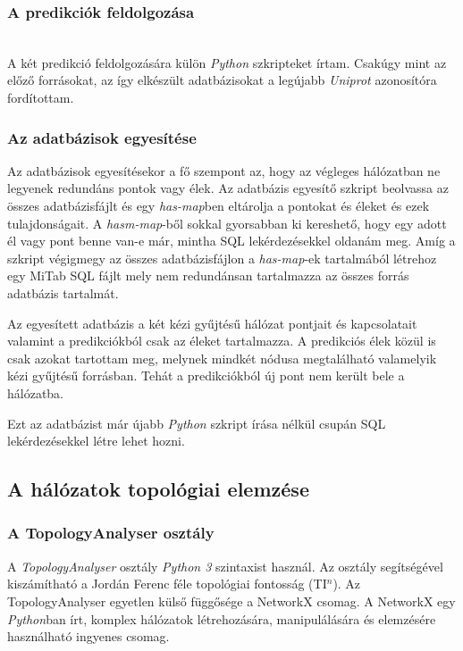 \documentclass[a4paper,12pt]{article}
\begin{document}
			\subsubsection{A predikciók feldolgozása} \mbox{}\\
			A két predikció feldolgozására külön \textit{Python} szkripteket írtam. Csakúgy mint az előző forrásokat, az így elkészült adatbázisokat a legújabb \textit{Uniprot} azonosítóra fordítottam.
			
			
		

	\subsubsection{Az adatbázisok egyesítése}
		Az adatbázisok egyesítésekor a fő szempont az, hogy az végleges hálózatban ne legyenek redundáns pontok vagy élek. Az adatbázis egyesítő szkript beolvassa az összes adatbázisfájlt és egy \textit{has-map}ben eltárolja a pontokat és éleket és ezek tulajdonságait. A \textit{hasm-map}-ből sokkal gyorsabban ki kereshető, hogy egy adott él vagy pont benne van-e már, mintha SQL lekérdezésekkel oldanám meg. Amíg a szkript végigmegy az összes adatbázisfájlon a \textit{has-map}-ek tartalmából létrehoz egy MiTab SQL fájlt mely nem redundánsan tartalmazza az összes forrás adatbázis tartalmát.
		
		Az egyesített adatbázis a két kézi gyűjtésű hálózat pontjait és kapcsolatait valamint a predikciókból csak az éleket tartalmazza. A predikciós élek közül is csak azokat tartottam meg, melynek mindkét nódusa megtalálható valamelyik kézi gyűjtésű forrásban. Tehát a predikciókból új pont nem került bele a hálózatba.
		
		Ezt az adatbázist már újabb \textit{Python} szkript írása nélkül csupán SQL lekérdezésekkel létre lehet hozni.

	\subsection{A hálózatok topológiai elemzése}
	
		\subsubsection{A TopologyAnalyser osztály}
		A \textit{TopologyAnalyser} osztály \textit{Python 3} szintaxist használ. Az osztály segítségével kiszámítható a Jordán Ferenc féle topológiai fontosság (TI$^n$). Az TopologyAnalyser egyetlen külső függősége a NetworkX csomag. A NetworkX egy \textit{Python}ban írt, komplex hálózatok létrehozására, manipulálására és elemzésére használható ingyenes csomag. 
		
\end{document}
